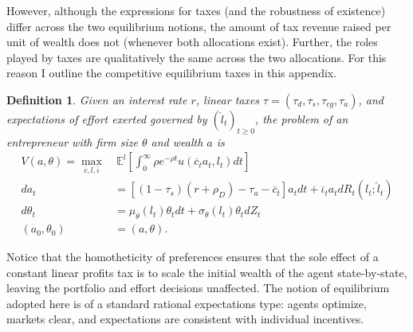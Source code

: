 \documentclass[11pt]{article}
\theoremstyle{plain}
\newtheorem{defn}{Definition}[section]
\begin{document}
However, although the expressions for taxes (and the robustness of existence) differ across the two equilibrium notions, the amount of tax revenue raised per unit of wealth does not (whenever both allocations exist). Further, the roles played by taxes are qualitatively the same across the two allocations. For this reason I outline the competitive equilibrium taxes in this appendix. 

\begin{defn} \label{conPROBlin}
Given an interest rate $r$, linear taxes $\tau = (\tau_d,\tau_s,\tau_{cg},\tau_a)$, and expectations of effort exerted governed by $(\hat{l}_t)_{t\geq0}$, the problem of an entrepreneur with firm size $\theta$ and wealth $a$ is
\begin{align*}
V(a,\theta) = \max_{\overline{c},l,\overline{\iota}} & \ \mathbb{E}^l{\left[\int_{0}^{\infty}\rho e^{-\rho t}u(\overline{c}_ta_t,l_t)dt\right]}
\\ da_t & = [(1-\tau_{s})(r + \rho_D) - \tau_a - \overline{c}_t]a_tdt + \overline{\iota}_t a_tdR_t(l_t;\hat{l}_t)
\\ d\theta_t & = \mu_{\theta}(l_t)\theta_t dt + \sigma_{\theta}(l_t) \theta_t dZ_t
\\ (a_0,\theta_0) & = (a,\theta).
\end{align*}
\end{defn}
Notice that the homotheticity of preferences ensures that the sole effect of a constant linear profits tax is to scale the initial wealth of the agent state-by-state, leaving the portfolio and effort decisions unaffected. The notion of equilibrium adopted here is of a standard rational expectations type: agents optimize, markets clear, and expectations are consistent with individual incentives. 
\end{document}
